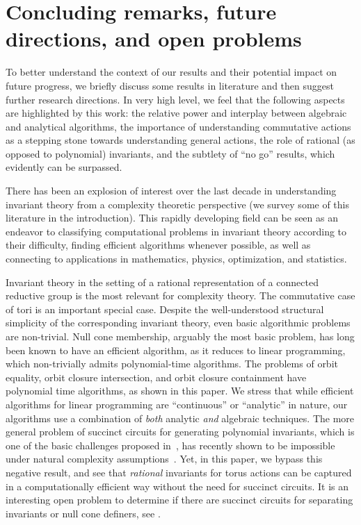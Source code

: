 \documentclass[10pt,a4paper]{article}
\theoremstyle{definition}
\numberwithin{equation}{section}
\begin{document}
%
\section{Concluding remarks, future directions, and open problems} \label{sec:future}
%
To better understand the context of our results and their potential impact on future progress, we briefly discuss some results in literature and then suggest further research directions.
In very high level, we feel that the following aspects are highlighted by this work:
the relative power and interplay between algebraic and analytical algorithms, the importance of understanding commutative actions as a stepping stone towards understanding general actions, the role of rational (as opposed to polynomial) invariants, and the subtlety of ``no go'' results, which evidently can be surpassed.

There has been an explosion of interest over the last decade in understanding invariant theory from a complexity theoretic perspective 
%
%
%
%
(we survey some of this literature in the introduction).
This rapidly developing field can be seen as an endeavor to classifying computational problems in invariant theory according to their difficulty,
finding efficient algorithms whenever possible, as well as connecting to applications in mathematics, physics, optimization, and statistics.

Invariant theory in the setting of a rational representation of a connected reductive group is the most relevant for complexity theory.
The commutative case of tori is an important special case.
Despite the well-understood structural simplicity of the corresponding invariant theory, even basic algorithmic problems are non-trivial.
Null cone membership, arguably the most basic problem, has long been known to have an efficient algorithm, as it reduces to linear programming, which non-trivially admits polynomial-time algorithms.
The problems of orbit equality, orbit closure intersection, and orbit closure containment have polynomial time algorithms, as shown in this paper.
We stress that while efficient algorithms for linear programming are ``continuous'' or ``analytic'' in nature, our algorithms use a combination of \emph{both} analytic \emph{and} algebraic techniques.
The more general problem of succinct circuits for generating polynomial invariants, which is one of the basic challenges proposed in~\cite{GCTV}, has recently shown to be impossible under natural complexity assumptions~\cite{GIMOWW}.
Yet, in this paper, we bypass this negative result, and see that \emph{rational} invariants for torus actions can be captured in a computationally efficient way without the need for succinct circuits.
It is an interesting open problem to determine if there are succinct circuits for separating invariants or null cone definers, see \cite[Problems~1.14, 1.15]{GIMOWW}.
\end{document}
